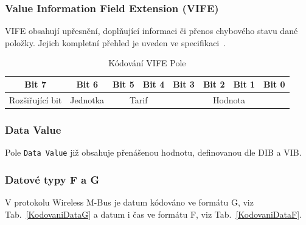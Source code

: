 \subsubsection{Value Information Field Extension (VIFE)}
VIFE obsahují upřesnění, doplňující informaci či přenos chybového stavu dané položky. Jejich kompletní přehled je uveden ve specifikaci~\cite{WmBusSpecka}.

\begin{table}[!ht]
\centering
\caption{Kódování VIFE Pole}
\label{KodovaniVIFE}
\begin{tabular}{|c|c|c|c|c|c|c|c|}
\hline \hline
\textbf{Bit 7}  & \textbf{Bit 6} & \textbf{Bit 5} & \textbf{Bit 4} & \textbf{Bit 3} & \textbf{Bit 2} & \textbf{Bit 1} & \textbf{Bit 0} \\ \hline 
Rozšiřující bit & Jednotka       & \multicolumn{2}{c|}{Tarif}      & \multicolumn{4}{c|}{Hodnota}                                      \\ \hline \hline
\end{tabular}
\end{table}

\subsubsection{Data Value}
Pole \texttt{Data Value} již obsahuje přenášenou hodnotu, definovanou dle DIB a VIB.


\subsubsection{Datové typy F a G}
V protokolu Wireless M-Bus je datum kódováno ve formátu G, viz Tab.~\ref{KodovaniDataG} a datum i čas ve formátu F, viz Tab.~\ref{KodovaniDataF}.  

